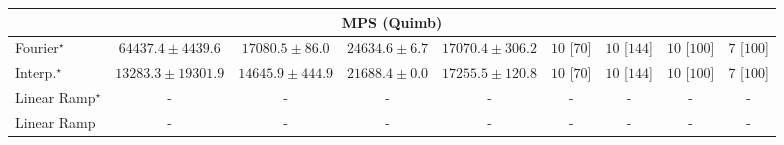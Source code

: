 \begin{tabular}{l|cccc|cccc|}
\cline{1-9}
\multicolumn{9}{c}{\rule{0pt}{8pt}MPS (Quimb)} \\
\midrule
Fourier$^\star$ & {\cellcolor[HTML]{C44802}} \color[HTML]{F1F1F1} $64437.4\pm 4439.6$ & {\cellcolor[HTML]{FFFBD3}} \color[HTML]{000000} $17080.5\pm 86.0$ & {\cellcolor[HTML]{FFF0AD}} \color[HTML]{000000} $24634.6\pm 6.7$ & {\cellcolor[HTML]{FFFBD3}} \color[HTML]{000000} $17070.4\pm 306.2$ & {\cellcolor[HTML]{49006A}} \color[HTML]{F1F1F1} $10$ [$70$] & {\cellcolor[HTML]{49006A}} \color[HTML]{F1F1F1} $10$ [$144$] & {\cellcolor[HTML]{49006A}} \color[HTML]{F1F1F1} $10$ [$100$] & {\cellcolor[HTML]{CD238F}} \color[HTML]{F1F1F1} $7$ [$100$] \\
Interp.$^\star$ & {\cellcolor[HTML]{FFFFE5}} \color[HTML]{000000} $13283.3\pm 19301.9$ & {\cellcolor[HTML]{FFFEDF}} \color[HTML]{000000} $14645.9\pm 444.9$ & {\cellcolor[HTML]{FFF7BC}} \color[HTML]{000000} $21688.4\pm 0.0$ & {\cellcolor[HTML]{FFFBD2}} \color[HTML]{000000} $17255.5\pm 120.8$ & {\cellcolor[HTML]{49006A}} \color[HTML]{F1F1F1} $10$ [$70$] & {\cellcolor[HTML]{49006A}} \color[HTML]{F1F1F1} $10$ [$144$] & {\cellcolor[HTML]{49006A}} \color[HTML]{F1F1F1} $10$ [$100$] & {\cellcolor[HTML]{CD238F}} \color[HTML]{F1F1F1} $7$ [$100$] \\
Linear Ramp$^\star$ & {\cellcolor[HTML]{000000}} \color[HTML]{F1F1F1} {\cellcolor{white}} \color{black} - & {\cellcolor[HTML]{000000}} \color[HTML]{F1F1F1} {\cellcolor{white}} \color{black} - & {\cellcolor[HTML]{000000}} \color[HTML]{F1F1F1} {\cellcolor{white}} \color{black} - & {\cellcolor[HTML]{000000}} \color[HTML]{F1F1F1} {\cellcolor{white}} \color{black} - & {\cellcolor[HTML]{000000}} \color[HTML]{F1F1F1} {\cellcolor{white}} \color{black} - & {\cellcolor[HTML]{000000}} \color[HTML]{F1F1F1} {\cellcolor{white}} \color{black} - & {\cellcolor[HTML]{000000}} \color[HTML]{F1F1F1} {\cellcolor{white}} \color{black} - & {\cellcolor[HTML]{000000}} \color[HTML]{F1F1F1} {\cellcolor{white}} \color{black} - \\
Linear Ramp & {\cellcolor[HTML]{000000}} \color[HTML]{F1F1F1} {\cellcolor{white}} \color{black} - & {\cellcolor[HTML]{000000}} \color[HTML]{F1F1F1} {\cellcolor{white}} \color{black} - & {\cellcolor[HTML]{000000}} \color[HTML]{F1F1F1} {\cellcolor{white}} \color{black} - & {\cellcolor[HTML]{000000}} \color[HTML]{F1F1F1} {\cellcolor{white}} \color{black} - & {\cellcolor[HTML]{000000}} \color[HTML]{F1F1F1} {\cellcolor{white}} \color{black} - & {\cellcolor[HTML]{000000}} \color[HTML]{F1F1F1} {\cellcolor{white}} \color{black} - & {\cellcolor[HTML]{000000}} \color[HTML]{F1F1F1} {\cellcolor{white}} \color{black} - & {\cellcolor[HTML]{000000}} \color[HTML]{F1F1F1} {\cellcolor{white}} \color{black} - \\

\end{tabular}
